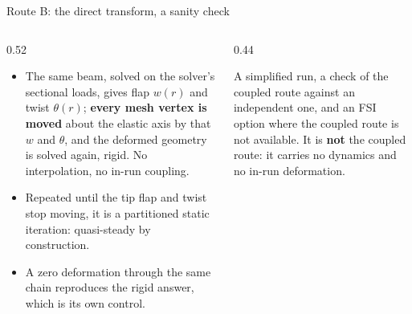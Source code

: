 \begin{frame}{Route B: the direct transform, a sanity check}
\begin{columns}[T]
\begin{column}{0.52\textwidth}
\begin{itemize}\small
  \item The same beam, solved on the solver's sectional loads, gives flap
        \(w(r)\) and twist \(\theta(r)\); \textbf{every mesh vertex is moved}
        about the elastic axis by that \(w\) and \(\theta\), and the deformed
        geometry is solved again, rigid. No interpolation, no in-run
        coupling.
  \item Repeated until the tip flap and twist stop moving, it is a
        partitioned static iteration: quasi-steady by construction.
  \item A zero deformation through the same chain reproduces the rigid
        answer, which is its own control.
\end{itemize}
\end{column}
\begin{column}{0.44\textwidth}
\begin{ftslimit}
\small A simplified run, a check of the coupled route against an
independent one, and an FSI option where the coupled route is not
available. It is \textbf{not} the coupled route: it carries no dynamics and
no in-run deformation.
\end{ftslimit}
\end{column}
\end{columns}
\end{frame}
